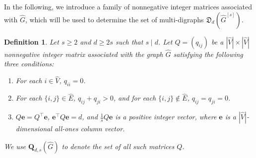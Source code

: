 \documentclass{article}
\newtheorem{defi}[thm]{Definition}
\begin{document}
In the following,
we introduce a family of nonnegative integer matrices associated with $\widehat{G}$,
which will be used to determine the set of multi-digraphs $\mathfrak{D}_{d}(\widehat{G}^{[s]})$.

%
%

\begin{defi}\label{dingyi1}
Let $s \geq 2$ and $d \geq 2s$ such that $s \mid d$.
Let $Q=(q_{ij})$ be a $|\widehat{V}|\times|\widehat{V}|$ nonnegative integer matrix associated with the graph $\widehat{G}$ satisfying the following three conditions:
\begin{enumerate}
\item[(i)] For each $i\in\widehat{V}$, $q_{ii}=0$.

\item[(ii)] For each $\{i,j\}\in\widehat{E}$, $q_{ij}+q_{ji}>0$, and for each $\{i,j\}\notin\widehat{E}$, $q_{ij}=q_{ji}=0$.

\item[(iii)]
$Q\mathbf{e}=Q^{\top}\mathbf{e}$,
$\mathbf{e}^{\top}Q\mathbf{e}=d$,
and $\frac{1}{s}Q\mathbf{e}$ is a positive integer vector,
where $\mathbf{e}$ is a $|\widehat{V}|$-dimensional all-ones column vector.
\end{enumerate}
We use $\mathbf{Q}_{d,s}(\widehat{G})$ to denote the set of all such matrices $Q$.
\end{defi}
\end{document}
